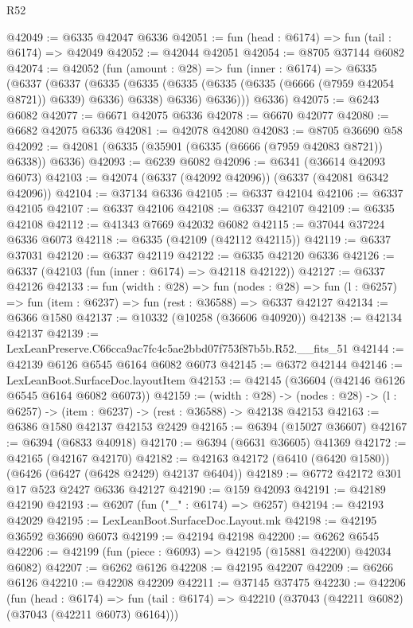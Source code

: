 \begin{lexlean}{R52}
\begin{coremodule}
@42049 := @6335 @42047 @6336
@42051 := fun (head : @6174) => fun (tail : @6174) => @42049
@42052 := @42044 @42051
@42054 := @8705 @37144 @6082
@42074 := @42052
    (fun (amount : @28) =>
    fun (inner : @6174) =>
    @6335
      (@6337
        (@6337
          (@6335
            (@6335 (@6335 (@6335 (@6335 (@6666 (@7959 @42054 @8721)) @6339) @6336) @6338) @6336)
            @6336)))
      @6336)
@42075 := @6243 @6082
@42077 := @6671 @42075 @6336
@42078 := @6670 @42077
@42080 := @6682 @42075 @6336
@42081 := @42078 @42080
@42083 := @8705 @36690 @58
@42092 := @42081 (@6335 (@35901 (@6335 (@6666 (@7959 @42083 @8721)) @6338)) @6336)
@42093 := @6239 @6082
@42096 := @6341 (@36614 @42093 @6073)
@42103 := @42074 (@6337 (@42092 @42096)) (@6337 (@42081 @6342 @42096))
@42104 := @37134 @6336
@42105 := @6337 @42104
@42106 := @6337 @42105
@42107 := @6337 @42106
@42108 := @6337 @42107
@42109 := @6335 @42108
@42112 := @41343 @7669 @42032 @6082
@42115 := @37044 @37224 @6336 @6073
@42118 := @6335 (@42109 (@42112 @42115))
@42119 := @6337 @37031
@42120 := @6337 @42119
@42122 := @6335 @42120 @6336
@42126 := @6337 (@42103 (fun (inner : @6174) => @42118 @42122))
@42127 := @6337 @42126
@42133 := fun (width : @28) =>
  fun (nodes : @28) => fun (l : @6257) => fun (item : @6237) => fun (rest : @36588) => @6337 @42127
@42134 := @6366 @1580
@42137 := @10332 (@10258 (@36606 @40920))
@42138 := @42134 @42137
@42139 := LexLeanPreserve.C66cca9ac7fc4c5ae2bbd07f753f87b5b.R52.__fits_51
@42144 := @42139 @6126 @6545 @6164 @6082 @6073
@42145 := @6372 @42144
@42146 := LexLeanBoot.SurfaceDoc.layoutItem
@42153 := @42145 (@36604 (@42146 @6126 @6545 @6164 @6082 @6073))
@42159 := (width : @28) ->
  (nodes : @28) -> (l : @6257) -> (item : @6237) -> (rest : @36588) -> @42138 @42153
@42163 := @6386 @1580 @42137 @42153 @2429
@42165 := @6394 (@15027 @36607)
@42167 := @6394 (@6833 @40918)
@42170 := @6394 (@6631 @36605) @41369
@42172 := @42165 (@42167 @42170)
@42182 := @42163 @42172 (@6410 (@6420 @1580)) (@6426 (@6427 (@6428 @2429) @42137 @6404))
@42189 := @6772 @42172 @301 @17 @523 @2427 @6336 @42127
@42190 := @159 @42093
@42191 := @42189 @42190
@42193 := @6207 (fun ("_" : @6174) => @6257)
@42194 := @42193 @42029
@42195 := LexLeanBoot.SurfaceDoc.Layout.mk
@42198 := @42195 @36592 @36690 @6073
@42199 := @42194 @42198
@42200 := @6262 @6545
@42206 := @42199 (fun (piece : @6093) => @42195 (@15881 @42200) @42034 @6082)
@42207 := @6262 @6126
@42208 := @42195 @42207
@42209 := @6266 @6126
@42210 := @42208 @42209
@42211 := @37145 @37475
@42230 := @42206
    (fun (head : @6174) =>
    fun (tail : @6174) => @42210 (@37043 (@42211 @6082) (@37043 (@42211 @6073) @6164)))

\end{coremodule}
\end{lexlean}

